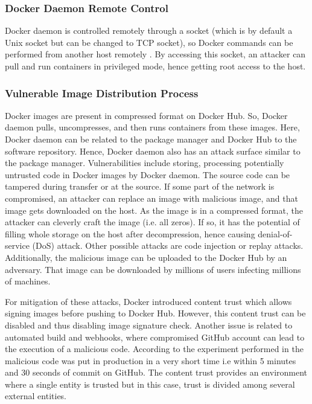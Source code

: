 \subsubsection{Docker Daemon Remote Control}

Docker daemon is controlled remotely through a socket (which
is by default a Unix socket but can be changed to TCP socket),
so Docker commands can be performed from another host
remotely \cite{combe2016docker}. By accessing this socket,
an attacker can pull and run containers in privileged mode,
hence getting root access to the host.

\subsubsection{Vulnerable Image Distribution Process}

Docker images are present in compressed format on Docker Hub.
So, Docker daemon pulls, uncompresses, and then runs containers
from these images. Here, Docker daemon can be related to the
package manager and Docker Hub to the software repository.
Hence, Docker daemon also has an attack surface similar
to the package manager. Vulnerabilities include storing,
processing potentially untrusted code in Docker images by
Docker daemon. The source code can be tampered during transfer
or at the source. If some part of the network is compromised,
an attacker can replace an image with malicious image, and
that image gets downloaded on the host. As the image is in
a compressed format, the attacker can cleverly craft the
image (i.e. all zeros). If so, it has the potential of
filling whole storage on the host after decompression,
hence causing
denial-of-service (DoS) attack. Other possible attacks are
code injection or replay attacks. Additionally, the malicious
image can be uploaded to the Docker Hub by an adversary.
That image can be downloaded by millions of users infecting
millions of machines.

For mitigation of these attacks, Docker introduced content
trust which allows signing images before pushing to Docker
Hub. However, this content trust can be disabled and thus disabling
image signature check. Another issue is related to automated build and
webhooks, where compromised GitHub
account can lead to the execution of a malicious code. According
to the experiment performed in \cite{martin2018docker} the
malicious code was put in production in a very short time i.e within 5 minutes and
30 seconds of commit on GitHub. The content trust provides
an environment where a single entity is trusted but in this
case, trust is divided among several external entities.


